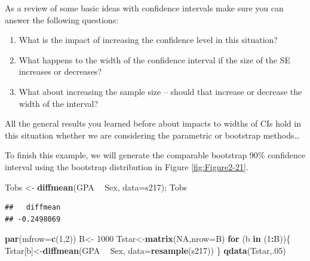 \documentclass[]{book}
\newenvironment{Shaded}{\begin{snugshade}}{\end{snugshade}}
\newcommand{\KeywordTok}[1]{\textcolor[rgb]{0.13,0.29,0.53}{\textbf{#1}}}
\newcommand{\DataTypeTok}[1]{\textcolor[rgb]{0.13,0.29,0.53}{#1}}
\newcommand{\DecValTok}[1]{\textcolor[rgb]{0.00,0.00,0.81}{#1}}
\newcommand{\StringTok}[1]{\textcolor[rgb]{0.31,0.60,0.02}{#1}}
\newcommand{\OtherTok}[1]{\textcolor[rgb]{0.56,0.35,0.01}{#1}}
\newcommand{\ControlFlowTok}[1]{\textcolor[rgb]{0.13,0.29,0.53}{\textbf{#1}}}
\newcommand{\OperatorTok}[1]{\textcolor[rgb]{0.81,0.36,0.00}{\textbf{#1}}}
\newcommand{\NormalTok}[1]{#1}
\theoremstyle{definition}
\theoremstyle{definition}
\theoremstyle{remark}
\begin{document}
As a review of some basic ideas with confidence intervals make sure you
can answer the following questions:

\begin{enumerate}
\def\labelenumi{\arabic{enumi}.}
\item
  What is the impact of increasing the confidence level in this
  situation?
\item
  What happens to the width of the confidence interval if the size of
  the SE increases or decreases?
\item
  What about increasing the sample size -- should that increase or
  decrease the width of the interval?
\end{enumerate}

All the general results you learned before about impacts to widths of
CIs hold in this situation whether we are considering the parametric or
bootstrap methods\ldots{}

To finish this example, we will generate the comparable bootstrap 90\%
confidence interval using the bootstrap distribution in Figure
\ref{fig:Figure2-21}.

\begin{Shaded}
\begin{Highlighting}[]
\NormalTok{Tobs <-}\StringTok{ }\KeywordTok{diffmean}\NormalTok{(GPA }\OperatorTok{~}\StringTok{ }\NormalTok{Sex, }\DataTypeTok{data=}\NormalTok{s217); Tobs}
\end{Highlighting}
\end{Shaded}

\begin{verbatim}
##   diffmean 
## -0.2498069
\end{verbatim}

\begin{Shaded}
\begin{Highlighting}[]
\KeywordTok{par}\NormalTok{(}\DataTypeTok{mfrow=}\KeywordTok{c}\NormalTok{(}\DecValTok{1}\NormalTok{,}\DecValTok{2}\NormalTok{))}
\NormalTok{B<-}\StringTok{ }\DecValTok{1000}
\NormalTok{Tstar<-}\KeywordTok{matrix}\NormalTok{(}\OtherTok{NA}\NormalTok{,}\DataTypeTok{nrow=}\NormalTok{B)}
\ControlFlowTok{for}\NormalTok{ (b }\ControlFlowTok{in}\NormalTok{ (}\DecValTok{1}\OperatorTok{:}\NormalTok{B))\{}
\NormalTok{  Tstar[b]<-}\KeywordTok{diffmean}\NormalTok{(GPA }\OperatorTok{~}\StringTok{ }\NormalTok{Sex, }\DataTypeTok{data=}\KeywordTok{resample}\NormalTok{(s217))}
\NormalTok{  \}}
\KeywordTok{qdata}\NormalTok{(Tstar,.}\DecValTok{05}\NormalTok{)}
\end{Highlighting}
\end{Shaded}
\end{document}
